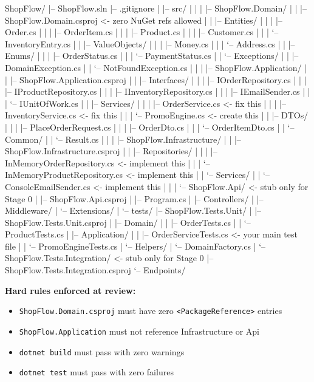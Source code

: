 \documentclass[11pt,a4paper]{article}
\begin{document}
\begin{treebox}
\begin{codeblock}
ShopFlow/
|-- ShopFlow.sln
|-- .gitignore
|
|-- src/
|   |
|   |-- ShopFlow.Domain/
|   |   |-- ShopFlow.Domain.csproj        <- zero NuGet refs allowed
|   |   |-- Entities/
|   |   |   |-- Order.cs
|   |   |   |-- OrderItem.cs
|   |   |   |-- Product.cs
|   |   |   |-- Customer.cs
|   |   |   `-- InventoryEntry.cs
|   |   |-- ValueObjects/
|   |   |   |-- Money.cs
|   |   |   `-- Address.cs
|   |   |-- Enums/
|   |   |   |-- OrderStatus.cs
|   |   |   `-- PaymentStatus.cs
|   |   `-- Exceptions/
|   |       |-- DomainException.cs
|   |       `-- NotFoundException.cs
|   |
|   |-- ShopFlow.Application/
|   |   |-- ShopFlow.Application.csproj
|   |   |-- Interfaces/
|   |   |   |-- IOrderRepository.cs
|   |   |   |-- IProductRepository.cs
|   |   |   |-- IInventoryRepository.cs
|   |   |   |-- IEmailSender.cs
|   |   |   `-- IUnitOfWork.cs
|   |   |-- Services/
|   |   |   |-- OrderService.cs           <- fix this
|   |   |   |-- InventoryService.cs       <- fix this
|   |   |   `-- PromoEngine.cs            <- create this
|   |   |-- DTOs/
|   |   |   |-- PlaceOrderRequest.cs
|   |   |   |-- OrderDto.cs
|   |   |   `-- OrderItemDto.cs
|   |   `-- Common/
|   |       `-- Result.cs
|   |
|   |-- ShopFlow.Infrastructure/
|   |   |-- ShopFlow.Infrastructure.csproj
|   |   |-- Repositories/
|   |   |   |-- InMemoryOrderRepository.cs   <- implement this
|   |   |   `-- InMemoryProductRepository.cs <- implement this
|   |   `-- Services/
|   |       `-- ConsoleEmailSender.cs         <- implement this
|   |
|   `-- ShopFlow.Api/                     <- stub only for Stage 0
|       |-- ShopFlow.Api.csproj
|       |-- Program.cs
|       |-- Controllers/
|       |-- Middleware/
|       `-- Extensions/
|
`-- tests/
    |-- ShopFlow.Tests.Unit/
    |   |-- ShopFlow.Tests.Unit.csproj
    |   |-- Domain/
    |   |   |-- OrderTests.cs
    |   |   `-- ProductTests.cs
    |   |-- Application/
    |   |   |-- OrderServiceTests.cs      <- your main test file
    |   |   `-- PromoEngineTests.cs
    |   `-- Helpers/
    |       `-- DomainFactory.cs
    |
    `-- ShopFlow.Tests.Integration/       <- stub only for Stage 0
        |-- ShopFlow.Tests.Integration.csproj
        `-- Endpoints/
\end{codeblock}
\end{treebox}

\begin{dangerbox}
\textbf{Hard rules enforced at review:}\\[4pt]
\begin{itemize}[leftmargin=1.2em,itemsep=2pt]
  \item \texttt{ShopFlow.Domain.csproj} must have zero \texttt{<PackageReference>} entries
  \item \texttt{ShopFlow.Application} must not reference Infrastructure or Api
  \item \texttt{dotnet build} must pass with zero warnings
  \item \texttt{dotnet test} must pass with zero failures
\end{itemize}
\end{dangerbox}
\end{document}
